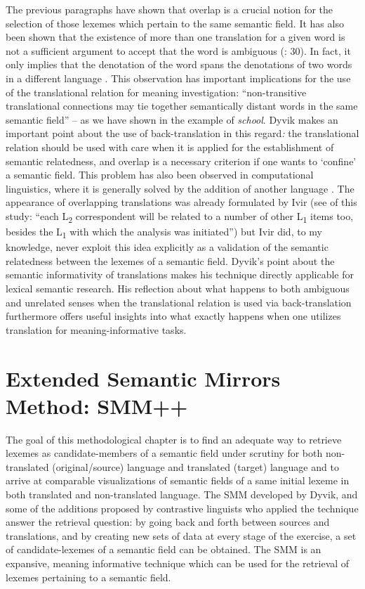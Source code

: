 The previous paragraphs have shown that overlap is a crucial notion for the selection of those lexemes which pertain to the same semantic field. It has also been shown that the existence of more than one translation for a given word is not a sufficient argument to accept that the word is ambiguous (\citealt{langemets_translations_2005}: 30). In fact, it only implies that the denotation of the word spans the denotations of two words in a different language \citep[29]{langemets_translations_2005}. This observation has important implications for the use of the translational relation for meaning investigation: “non-transitive translational connections may tie together semantically distant words in the same semantic field” \citealt[29]{langemets_translations_2005} – as we have shown in the example of \textit{school}. Dyvik makes an important point about the use of back-translation in this regard\textit{:} the translational relation should be used with care when it is applied for the establishment of semantic relatedness, and overlap is a necessary criterion if one wants to ‘confine’ a semantic field. This problem has also been observed in computational linguistics, where it is generally solved by the addition of another language \citep{gelbukh_five_2013}. The appearance of overlapping translations was already formulated by Ivir (see  of this study: “each L\textsubscript{2} correspondent will be related to a number of other L\textsubscript{1} items too, besides the L\textsubscript{1} with which the analysis was initiated”) but Ivir did, to my knowledge, never exploit this idea explicitly as a validation of the semantic relatedness between the lexemes of a semantic field. Dyvik’s point about the semantic informativity of translations makes his technique directly applicable for lexical semantic research. His reflection about what happens to both ambiguous and unrelated senses when the translational relation is used via back-translation furthermore offers useful insights into what exactly happens when one utilizes translation for meaning-informative tasks.


\section{\label{sec:3.5}  Extended Semantic Mirrors Method: SMM++}

The goal of this methodological chapter is to find an adequate way to retrieve lexemes as candidate-members of a semantic field under scrutiny for both non-translated (original/source) language and translated (target) language and to arrive at comparable visualizations of semantic fields of a same initial lexeme in both translated and non-translated language. The SMM developed by Dyvik, and some of the additions proposed by contrastive linguists who applied the technique answer the retrieval\textbf{ }question: by going back and forth between sources and translations, and by creating new sets of data at every stage of the exercise, a set of candidate-lexemes of a semantic field can be obtained. The SMM is an expansive, meaning informative technique which can be used for the retrieval of lexemes pertaining to a semantic field.



